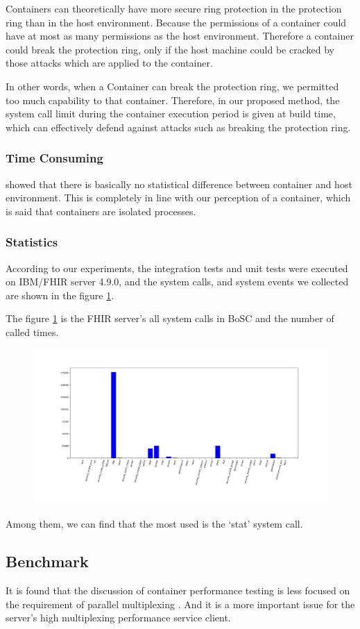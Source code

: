 Containers can theoretically have more secure ring protection in the
protection ring than in the host environment. Because the permissions
of a container could have at most as many permissions as the host environment.
Therefore a container could break the protection ring, only if the host
machine could be cracked by those attacks which are applied to the container.

In other words, when a Container can break the protection ring, we permitted
too much capability to that container. Therefore, in our proposed method, the
system call limit during the container execution period is given at build time,
which can effectively defend against attacks such as breaking the protection ring.

\subsubsection{Time Consuming}
\textcite{KOZHIRBAYEV2017175} showed that there is basically no
statistical difference between container and host environment.
This is completely in line with our perception of a container,
which is said that containers are isolated processes.

\subsubsection{Statistics}
According to our experiments, the integration tests and unit
tests were executed on IBM/FHIR server 4.9.0, and the system calls,
and system events we collected are shown in the figure \ref{hist}.

The figure \ref{hist} is the FHIR server's all system calls in
BoSC\cite{1495942} and the number of called times.
\begin{figure}
    \centering
    \includegraphics[width=.5\textwidth]{src/hist.png}
    \label{hist}
\end{figure}
Among them, we can find that the most used is the `stat' system call.

\subsection{Benchmark}
It is found that the discussion of container performance testing is less
focused on the requirement of parallel multiplexing
\cite{7371699,KOZHIRBAYEV2017175,7095802,234857}. And it is a more
important issue for the server's high multiplexing performance service client.

